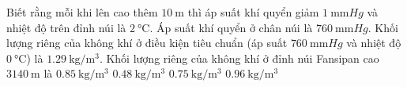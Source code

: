 \begin{ex}
	Biết rằng mỗi khi lên cao thêm $\SI{10}{\meter}$ thì áp suất khí quyển giảm $\SI{1}{\milli\meter Hg}$ và nhiệt độ trên đỉnh núi là $\SI{2}{\celsius}$. Áp suất khí quyển ở chân núi là $\SI{760}{\milli\meter Hg}$. Khối lượng riêng của không khí ở điều kiện tiêu chuẩn (áp suất $\SI{760}{\milli\meter Hg}$ và nhiệt độ $\SI{0}{\celsius}$) là $\SI{1.29}{\kilogram/\meter^3}$. Khối lượng riêng của không khí ở đỉnh núi Fansipan cao $\SI{3140}{\meter}$ là
	\choice
	{$\SI{0.85}{\kilogram/\meter^3}$}
	{$\SI{0.48}{\kilogram/\meter^3}$}
	{\True $\SI{0.75}{\kilogram/\meter^3}$}
	{$\SI{0.96}{\kilogram/\meter^3}$}
\end{ex}
